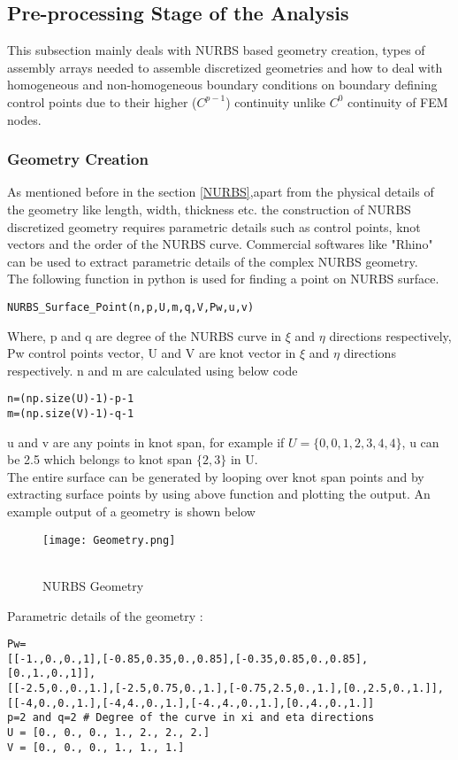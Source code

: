 \documentclass[11pt]{article}
\begin{document}
\subsection{Pre-processing Stage of the Analysis}
This subsection mainly deals with NURBS based geometry creation, types of
assembly arrays needed to assemble discretized geometries and how to deal with
homogeneous and non-homogeneous boundary conditions on boundary defining control
points due to their higher ($C^{p-1}$) continuity unlike $C^{0}$ continuity of
FEM nodes. 

\subsubsection{Geometry Creation} \label{GeometryCreation}
As mentioned before in the section \ref{NURBS},apart from the physical details of the geometry like length, width, thickness etc. the construction of NURBS
discretized geometry requires parametric details such as control points, knot
vectors and the order of the NURBS curve. Commercial softwares like "Rhino" can
be used to extract parametric details of the complex NURBS geometry. \\
The following function in python is used for finding a point on NURBS surface.
\begin{verbatim}
NURBS_Surface_Point(n,p,U,m,q,V,Pw,u,v)
\end{verbatim}
Where, p and q are degree of the NURBS curve in $\xi$ and $\eta$ directions respectively, Pw control points vector, U and V are knot vector in $\xi$ and $\eta$ directions respectively. 
n and m are calculated using below code
\begin{verbatim}
n=(np.size(U)-1)-p-1
m=(np.size(V)-1)-q-1 
\end{verbatim}
u and v are any points in knot span, for example if 
$U = \{0,0,1,2,3,4,4\}$,
u can be 2.5 which belongs to knot span $\{2,3\}$ in U.\\
The entire surface can be generated by looping over knot span points and by extracting surface points by using above function and plotting the output. 
An example output of a geometry is shown below
\begin{figure}[H]
	\begin{center}
		\texttt{[image: Geometry.png]} 
		\caption{\\NURBS Geometry}\label{Geometry}
	\end{center}	
\end{figure}
Parametric details of the geometry \cite{agrawal2019iga}:
\begin{verbatim}
Pw=
[[-1.,0.,0.,1],[-0.85,0.35,0.,0.85],[-0.35,0.85,0.,0.85],[0.,1.,0.,1]],
[[-2.5,0.,0.,1.],[-2.5,0.75,0.,1.],[-0.75,2.5,0.,1.],[0.,2.5,0.,1.]],
[[-4,0.,0.,1.],[-4,4.,0.,1.],[-4.,4.,0.,1.],[0.,4.,0.,1.]]
p=2 and q=2 # Degree of the curve in xi and eta directions
U = [0., 0., 0., 1., 2., 2., 2.]
V = [0., 0., 0., 1., 1., 1.]
\end{verbatim}
\end{document}
